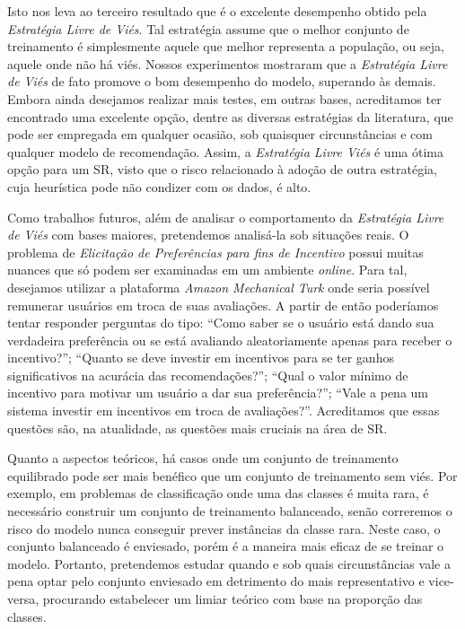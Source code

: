 Isto nos leva ao terceiro resultado que é o excelente desempenho obtido pela \textit{Estratégia Livre de Viés}. Tal estratégia assume que o melhor conjunto de treinamento é simplesmente aquele que melhor representa a população, ou seja, aquele onde não há viés. Nossos experimentos mostraram que a \textit{Estratégia Livre de Viés} de fato promove o bom desempenho do modelo, superando às demais. Embora ainda desejamos realizar mais testes, em outras bases, acreditamos ter encontrado uma excelente opção, dentre as diversas estratégias da literatura, que pode ser empregada em qualquer ocasião, sob quaisquer circunstâncias e com qualquer modelo de recomendação. Assim, a \textit{Estratégia Livre Viés} é uma ótima opção para um SR, visto que o risco relacionado à adoção de outra estratégia, cuja heurística pode não condizer com os dados, é alto.

Como trabalhos futuros, além de analisar o comportamento da \textit{Estratégia Livre de Viés} com bases maiores, pretendemos analisá-la sob situações reais. O problema de \textit{Elicitação de Preferências para fins de Incentivo} possui muitas nuances que só podem ser examinadas em um ambiente \textit{online}. Para tal, desejamos utilizar a plataforma \textit{Amazon Mechanical Turk} \citep{lee2013alleviating} onde seria possível remunerar usuários em troca de suas avaliações. A partir de então poderíamos tentar responder perguntas do tipo: ``Como saber se o usuário está dando sua verdadeira preferência ou se está avaliando aleatoriamente apenas para receber o incentivo?''; ``Quanto se deve investir em incentivos para se ter ganhos significativos na acurácia das recomendações?''; ``Qual o valor mínimo de incentivo para motivar um usuário a dar sua preferência?''; ``Vale a pena um sistema investir em incentivos em troca de avaliações?''. Acreditamos que essas questões são, na atualidade, as questões mais cruciais na área de SR.

Quanto a aspectos teóricos, há casos onde um conjunto de treinamento equilibrado pode ser mais benéfico que um conjunto de treinamento sem viés. Por exemplo, em problemas de classificação onde uma das classes é muita rara, é necessário construir um conjunto de treinamento balanceado, senão correremos o risco do modelo nunca conseguir prever instâncias da classe rara. Neste caso, o conjunto balanceado é enviesado, porém é a maneira mais eficaz de se treinar o modelo. Portanto, pretendemos estudar quando e sob quais circunstâncias vale a pena optar pelo conjunto enviesado em detrimento do mais representativo e vice-versa, procurando estabelecer um limiar teórico com base na proporção das classes.





